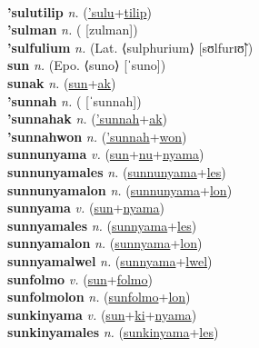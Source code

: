  \label{'suluak} \\
\textbf{'sulutilip} \textit{n.} (\hyperref['sulu]{'sulu}+\hyperref[tilip]{tilip})
 \label{'sulutilip} \\
\textbf{'sulman} \textit{n.} ( [zulman])
 \label{'sulman} \\
\textbf{'sulfulium} \textit{n.} (Lat. ⟨sulphurium⟩ [sʊlfurɪʊ̃])
 \label{'sulfulium} \\
\textbf{sun} \textit{n.} (Epo. ⟨suno⟩ [ˈsuno])
 \label{sun} \\
\textbf{sunak} \textit{n.} (\hyperref[sun]{sun}+\hyperref[ak]{ak})
 \label{sunak} \\
\textbf{'sunnah} \textit{n.} ( [ˈsunnah])
 \label{'sunnah} \\
\textbf{'sunnahak} \textit{n.} (\hyperref['sunnah]{'sunnah}+\hyperref[ak]{ak})
 \label{'sunnahak} \\
\textbf{'sunnahwon} \textit{n.} (\hyperref['sunnah]{'sunnah}+\hyperref[won]{won})
 \label{'sunnahwon} \\
\textbf{sunnunyama} \textit{v.} (\hyperref[sun]{sun}+\hyperref[nu]{nu}+\hyperref[nyama]{nyama})
 \label{sunnunyama} \\
\textbf{sunnunyamales} \textit{n.} (\hyperref[sunnunyama]{sunnunyama}+\hyperref[les]{les})
 \label{sunnunyamales} \\
\textbf{sunnunyamalon} \textit{n.} (\hyperref[sunnunyama]{sunnunyama}+\hyperref[lon]{lon})
 \label{sunnunyamalon} \\
\textbf{sunnyama} \textit{v.} (\hyperref[sun]{sun}+\hyperref[nyama]{nyama})
 \label{sunnyama} \\
\textbf{sunnyamales} \textit{n.} (\hyperref[sunnyama]{sunnyama}+\hyperref[les]{les})
 \label{sunnyamales} \\
\textbf{sunnyamalon} \textit{n.} (\hyperref[sunnyama]{sunnyama}+\hyperref[lon]{lon})
 \label{sunnyamalon} \\
\textbf{sunnyamalwel} \textit{n.} (\hyperref[sunnyama]{sunnyama}+\hyperref[lwel]{lwel})
 \label{sunnyamalwel} \\
\textbf{sunfolmo} \textit{v.} (\hyperref[sun]{sun}+\hyperref[folmo]{folmo})
 \label{sunfolmo} \\
\textbf{sunfolmolon} \textit{n.} (\hyperref[sunfolmo]{sunfolmo}+\hyperref[lon]{lon})
 \label{sunfolmolon} \\
\textbf{sunkinyama} \textit{v.} (\hyperref[sun]{sun}+\hyperref[ki]{ki}+\hyperref[nyama]{nyama})
 \label{sunkinyama} \\
\textbf{sunkinyamales} \textit{n.} (\hyperref[sunkinyama]{sunkinyama}+\hyperref[les]{les})
